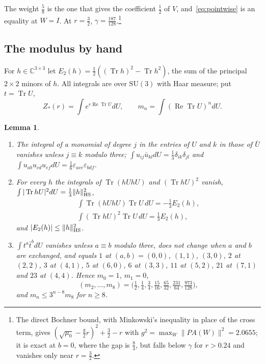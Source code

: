 \documentclass[aps,prd,twocolumn,superscriptaddress,nofootinbib,longbibliography,floatfix,amsmath,amssymb,10pt]{revtex4-2}
\newtheorem{lemma}[theorem]{Lemma}
\theoremstyle{definition}
\theoremstyle{remark}
\newcommand{\C}{\mathbb{C}}
\newcommand{\SU}{\mathrm{SU}}
\newcommand{\Tr}{\operatorname{Tr}}
\newcommand{\ReTr}{\operatorname{Re}\operatorname{Tr}}
\begin{document}
The weight $\frac58$ is the one that gives the coefficient $\frac12$ of $V$,
and~\eqref{eq:pointwise} is an equality at $W=I$. At $r=\frac32$,
$\gamma=\frac{187}{128}$.\footnote{The direct Bochner bound, with
Minkowski's inequality in place of the cross term, gives
$(\sqrt{\mu_0}-\frac g2r)^2+\frac32-r$ with $g^2=\max_W\|PA(W)\|^2=2.0655$;
it is exact at $b=0$, where the gap is $\frac83$, but falls below $\gamma$
for $r>0.24$ and vanishes only near $r=\frac32$.}

\subsection{The modulus by hand}\label{ssec:su3modulus}

For $h\in\C^{3\times3}$ let $E_2(h)=\frac12((\Tr h)^2-\Tr h^2)$, the sum
of the principal $2\times2$ minors of $h$. All integrals are over $\SU(3)$
with Haar measure; put $t=\Tr U$,
\[
Z_*(r)=\int e^{r\ReTr U}dU,\qquad m_n=\int(\ReTr U)^ndU .
\]

\begin{lemma}\label{lem:su3haar}\leavevmode
\begin{enumerate}[label=\textup{(\roman*)},leftmargin=*]
\item The integral of a monomial of degree $j$ in the entries of $U$ and
$k$ in those of $\bar U$ vanishes unless $j\equiv k$ modulo three;
$\int u_{ij}\bar u_{kl}dU=\frac13\delta_{ik}\delta_{jl}$ and $\int u_{ab}
u_{cd}u_{ef}dU=\frac16\varepsilon_{ace}\varepsilon_{bdf}$.
\item For every $h$ the integrals of $\Tr(hUhU)$ and $(\Tr hU)^2$
vanish, $\int|\Tr hU|^2dU=\frac13\|h\|_{\rm HS}^2$,
\begin{gather*}
\int\Tr(hUhU)\Tr U\,dU=-\tfrac13E_2(h),\\
\int(\Tr hU)^2\Tr U\,dU=\tfrac13E_2(h),
\end{gather*}
and $|E_2(h)|\le\|h\|_{\rm HS}^2$.
\item $\int t^a\bar t^bdU$ vanishes unless $a\equiv b$ modulo three, does
not change when $a$ and $b$ are exchanged, and equals $1$ at $(a,b)=
(0,0)$, $(1,1)$, $(3,0)$, $2$ at $(2,2)$, $3$ at $(4,1)$, $5$ at $(6,0)$,
$6$ at $(3,3)$, $11$ at $(5,2)$, $21$ at $(7,1)$ and $23$ at $(4,4)$.
Hence $m_0=1$, $m_1=0$,
\[
(m_2,\dots,m_8)=\bigl(\tfrac12,\tfrac14,\tfrac34,\tfrac{15}{16},
\tfrac{65}{32},\tfrac{231}{64},\tfrac{973}{128}\bigr),
\]
and $m_n\le3^{n-8}m_8$ for $n\ge8$.
\end{enumerate}
\end{lemma}
\end{document}
